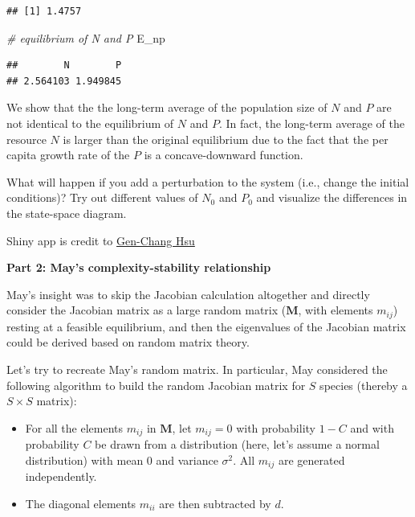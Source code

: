 \documentclass[
]{book}
\newenvironment{Shaded}{\begin{snugshade}}{\end{snugshade}}
\newcommand{\CommentTok}[1]{\textcolor[rgb]{0.56,0.35,0.01}{\textit{#1}}}
\newcommand{\NormalTok}[1]{#1}
\begin{document}
\begin{verbatim}
## [1] 1.4757
\end{verbatim}

\begin{Shaded}
\begin{Highlighting}[]
\CommentTok{\# equilibrium of N and P}
\NormalTok{E\_np}
\end{Highlighting}
\end{Shaded}

\begin{verbatim}
##        N        P 
## 2.564103 1.949845
\end{verbatim}

We show that the the long-term average of the population size of \(N\) and \(P\) are not identical to the equilibrium of \(N\) and \(P\). In fact, the long-term average of the resource \(N\) is larger than the original equilibrium due to the fact that the per capita growth rate of the \(P\) is a concave-downward function.

What will happen if you add a perturbation to the system (i.e., change the initial conditions)? Try out different values of \(N_0\) and \(P_0\) and visualize the differences in the state-space diagram.

Shiny app is credit to \href{https://genchanghsu.github.io/index.html}{Gen-Chang Hsu}

\textbf{Part 2: May's complexity-stability relationship}

May's insight was to skip the Jacobian calculation altogether and directly consider the Jacobian matrix as a large random matrix (\(\mathbf{M}\), with elements \(m_{ij}\)) resting at a feasible equilibrium, and then the eigenvalues of the Jacobian matrix could be derived based on random matrix theory.

Let's try to recreate May's random matrix. In particular, May considered the following algorithm to build the random Jacobian matrix for \(S\) species (thereby a \(S \times S\) matrix):

\begin{itemize}
    \item For all the elements $m_{ij}$ in $\mathbf{M}$, let $m_{ij} = 0$ with probability $1-C$ and with probability $C$ be drawn from a distribution (here, let's assume a normal distribution) with mean 0 and variance $\sigma^{2}$. All $m_{ij}$ are generated independently.
    \item The diagonal elements $m_{ii}$ are then subtracted by $d$. 
\end{itemize}
\end{document}
